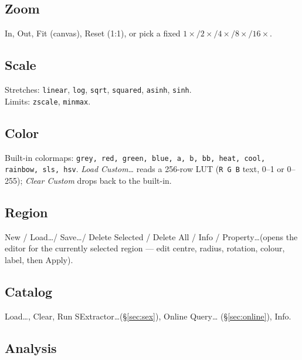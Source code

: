 \documentclass[11pt,a4paper]{article}
\begin{document}
\subsection{Zoom}

In, Out, Fit (canvas), Reset (1:1), or pick a fixed
$1\times / 2\times / 4\times / 8\times / 16\times$.

\subsection{Scale}

Stretches: \texttt{linear}, \texttt{log}, \texttt{sqrt}, \texttt{squared},
\texttt{asinh}, \texttt{sinh}.\\
Limits: \texttt{zscale}, \texttt{minmax}.

\subsection{Color}

Built-in colormaps: \texttt{grey, red, green, blue, a, b, bb, heat, cool,
rainbow, sls, hsv}. \emph{Load Custom\dots} reads a 256-row LUT
(\texttt{R G B} text, 0--1 or 0--255); \emph{Clear Custom} drops back to
the built-in.

\subsection{Region}

New / Load\dots / Save\dots / Delete Selected / Delete All / Info /
Property\dots (opens the editor for the currently selected region ---
edit centre, radius, rotation, colour, label, then Apply).

\subsection{Catalog}

Load\dots, Clear, Run SExtractor\dots (\S\ref{sec:sex}), Online Query\dots
(\S\ref{sec:online}), Info.

\subsection{Analysis}
\end{document}
